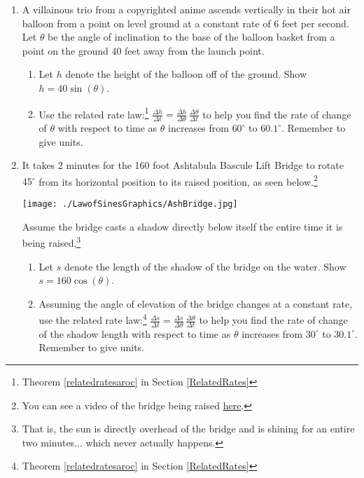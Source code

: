 \documentclass{ximera}
\begin{document}
\begin{enumerate}
\setcounter{enumi}{\value{HW}}
\item \label{losincliniationdepressionexlast} A villainous trio from a copyrighted anime ascends vertically in their hot air balloon from a point on level ground at a constant rate of $6$ feet per second.  Let $\theta$ be the angle of inclination to the base of the balloon basket from a point on the ground 40 feet away from the launch point.  

\begin{enumerate}

\item Let $h$ denote the height of the balloon off of the ground.  Show $h = 40 \sin(\theta)$.

\item Use the related rate law:\footnote{Theorem \ref{relatedratesaroc} in Section  \ref{RelatedRates}}  $\frac{\Delta h}{\Delta t} = \frac{\Delta h}{\Delta \theta} \, \frac{\Delta \theta}{\Delta t}$ to help you find the rate of change of $\theta$ with respect to time as $\theta$ increases from $60^{\circ}$ to $60.1^{\circ}$.  Remember to give units.

\end{enumerate}


\item  It takes 2 minutes for the 160 foot Ashtabula Bascule Lift Bridge to rotate $45^{\circ}$ from its horizontal position to its raised position, as seen below.\footnote{You can see a video of the bridge being raised  \href{http://www.youtube.com/watch?v=PRwZzzPyK2g}{\underline{here}}.}


\smallskip

\centerline{\texttt{[image: ./LawofSinesGraphics/AshBridge.jpg]}}

\smallskip


Assume the bridge casts a shadow directly below itself the entire time it is being raised,\footnote{That is, the sun is directly overhead of the bridge and is shining for an entire two minutes... which never actually happens.} 

\begin{enumerate}

\item  Let $s$ denote the length of the shadow of the bridge on the water.  Show $s = 160 \cos(\theta)$. 
 
\smallskip

\item Assuming  the angle of elevation of the bridge changes at a constant rate, use the related rate law:\footnote{Theorem \ref{relatedratesaroc} in Section  \ref{RelatedRates}} $\frac{\Delta s}{\Delta t} = \frac{\Delta s}{\Delta \theta} \, \frac{\Delta \theta}{\Delta t}$   to help you find the rate of change of the shadow length with respect to time as $\theta$ increases from $30^{\circ}$ to $30.1^{\circ}$.  Remember to give units.


\end{enumerate}

\setcounter{HW}{\value{enumi}}
\end{enumerate}
\end{document}
